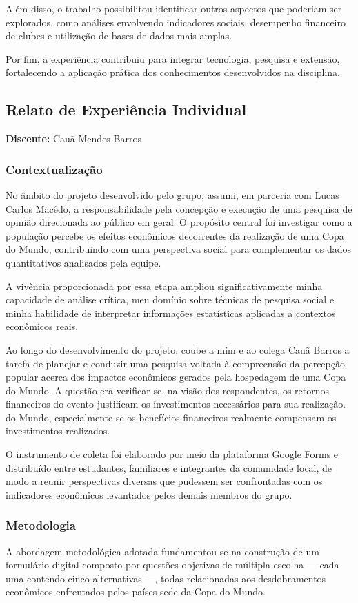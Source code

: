 \documentclass[12pt, a4paper, brazil]{article}
\begin{document}
Além disso, o trabalho possibilitou identificar outros aspectos que poderiam ser explorados, como análises envolvendo indicadores sociais, desempenho financeiro de clubes e utilização de bases de dados mais amplas.

Por fim, a experiência contribuiu para integrar tecnologia, pesquisa e extensão, fortalecendo a aplicação prática dos conhecimentos desenvolvidos na disciplina.

\subsection{Relato de Experiência Individual}
\textbf{Discente:} Cauã Mendes Barros

\subsubsection{Contextualização}
No âmbito do projeto desenvolvido pelo grupo, assumi, em parceria com Lucas Carlos Macêdo, a responsabilidade pela concepção e execução de uma pesquisa de opinião direcionada ao público em geral. O propósito central foi investigar como a população percebe os efeitos econômicos decorrentes da realização de uma Copa do Mundo, contribuindo com uma perspectiva social para complementar os dados quantitativos analisados pela equipe.

A vivência proporcionada por essa etapa ampliou significativamente minha capacidade de análise crítica, meu domínio sobre técnicas de pesquisa social e minha habilidade de interpretar informações estatísticas aplicadas a contextos econômicos reais.

Ao longo do desenvolvimento do projeto, coube a mim e ao colega Cauã Barros a tarefa de planejar e conduzir uma pesquisa voltada à compreensão da percepção popular acerca dos impactos econômicos gerados pela hospedagem de uma Copa do Mundo. A questão era verificar se, na visão dos respondentes, os retornos financeiros do evento justificam os  investimentos necessários para sua realização. do Mundo, especialmente se os benefícios financeiros realmente compensam os investimentos realizados.

O instrumento de coleta foi elaborado por meio da plataforma Google Forms e distribuído entre estudantes, familiares e integrantes da comunidade local, de modo a reunir perspectivas diversas que pudessem ser confrontadas com os indicadores econômicos levantados pelos demais membros do grupo.

\subsubsection{Metodologia}
A abordagem metodológica adotada fundamentou-se na construção de um formulário digital composto por questões objetivas de múltipla escolha — cada uma contendo cinco alternativas —, todas relacionadas aos desdobramentos econômicos enfrentados pelos países-sede da Copa do Mundo.
\end{document}
